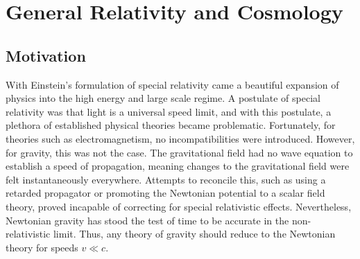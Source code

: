 \chapter{General Relativity and Cosmology}
\section{Motivation}
With Einstein's formulation of special relativity came a beautiful expansion of physics into the high energy and large scale regime. A postulate of special relativity was that light is a universal speed limit, and with this postulate, a plethora of established physical theories became problematic. Fortunately, for theories such as electromagnetism, no incompatibilities were introduced. However, for gravity, this was not the case. The gravitational field had no wave equation to establish a speed of propagation, meaning changes to the gravitational field were felt instantaneously everywhere. Attempts to reconcile this, such as using a retarded propagator or promoting the Newtonian potential to a scalar field theory, proved incapable of correcting for special relativistic effects. Nevertheless, Newtonian gravity has stood the test of time to be accurate in the non-relativistic limit. Thus, any theory of gravity should reduce to the Newtonian theory for speeds $v \ll c$.

